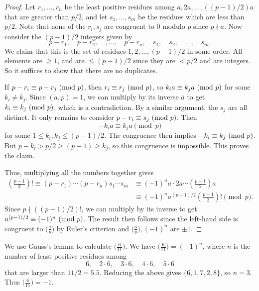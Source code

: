 \begin{proof}
  Let $r_1, \dots, r_n$ be the least
  positive residues among
  $a, 2a, \dots, ((p - 1) / 2)a$
  that are greater than $p / 2$, and
  let $s_1, \dots, s_m$ be the residues
  which are less than $p / 2$.
  Note that none of the $r_i, s_j$
  are congruent to $0$ modulo $p$
  since $p \nmid a$. Now consider the
  $(p - 1) / 2$ integers given by
  \[
    p - r_1, \quad p - r_2, \quad,
    \dots, \quad p - r_n, \quad
    s_1, \quad s_2, \quad \dots, \quad s_m.
  \]
  We claim that this is the set of
  residues $1, 2, \dots, (p - 1) / 2$
  in some order. All elements
  are $\ge 1$, and are $\le (p - 1) / 2$ 
  since they are $< p / 2$ and
  are integers. So it suffices to
  show that there are no duplicates.

  If $p - r_i \equiv p - r_j \ (\mathrm{mod}\ p)$,
  then $r_i \equiv r_j \ (\mathrm{mod}\ p)$, so
  $k_i a \equiv k_j a \ (\mathrm{mod}\ p)$
  for some $k_i \ne k_j$. Since
  $(a, p) = 1$, we can multiply by its
  inverse $\overline{a}$ to get
  $k_i \equiv k_j \ (\mathrm{mod}\ p)$, which is
  a contradiction.
  By a similar argument, the
  $s_j$ are all distinct.
  It only remains to consider
  $p - r_i \equiv s_j \ (\mathrm{mod}\ p)$. Then
  \[
    -k_i a \equiv k_j a \pmod{p}
  \]
  for some $1 \le k_i, k_j \le (p - 1) / 2$.
  The congruence then implies
  $-k_i \equiv k_j \ (\mathrm{mod}\ p)$. But
  $p - k_i > p / 2 \ge (p - 1) \ge k_j$,
  so this congruence is impossible.
  This proves the claim.

  Thus, multiplying all the numbers
  together gives
  \begin{align*}
    \left(\frac{p - 1}{2}\right)!
    \equiv (p - r_1) \cdots (p - r_n)
    s_1 \cdots s_m
    &\equiv (-1)^n a \cdot 2a \cdots \left(\frac{p - 1}{2}\right) a \\
    &\equiv (-1)^n a^{(p - 1) / 2} \left(\frac{p - 1}{2}\right)!
    \pmod{p}.
  \end{align*}
  Since $p \nmid ((p - 1) / 2)!$,
  we can multiply by its inverse to
  get $a^{(p - 1) / 2} \equiv (-1)^n \ (\mathrm{mod}\ p)$.
  The result then follows since the
  left-hand side is congruent to
  $\big(\frac{a}{p}\big)$ by Euler's
  criterion and $\big(\frac{a}{p}\big),
  (-1)^n$
  are $\pm 1$.
\end{proof}

\begin{example}
  We use Gauss's lemma to calculate
  $\big(\frac{6}{11}\big)$. We have
  $\big(\frac{6}{11}\big) = (-1)^n$,
  where $n$ is the number of least
  positive residues among
  \[
    6, \quad 2 \cdot 6, \quad
    3 \cdot 6, \quad 4 \cdot 6, \quad
    5 \cdot 6
  \]
  that are larger than $11 / 2 = 5.5$.
  Reducing the above gives
  $\{6, 1, 7, 2, 8\}$, so
  $n = 3$. Thus
  $\big(\frac{6}{11}\big) = -1$.
\end{example}

